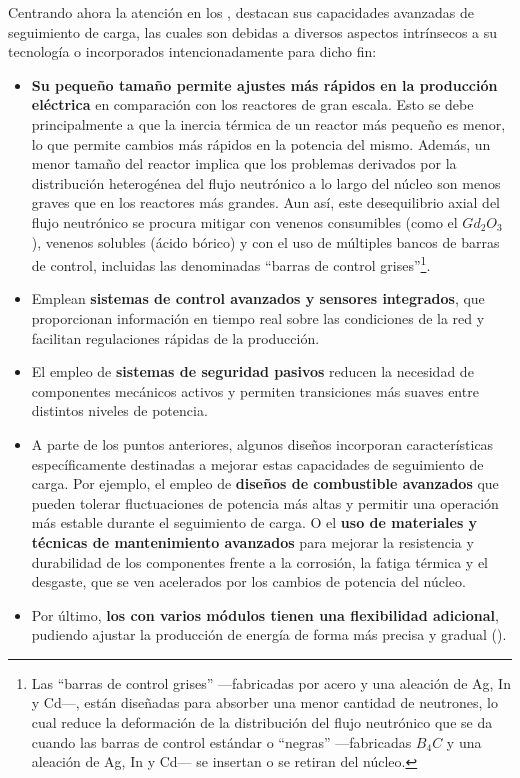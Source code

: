 Centrando ahora la atención en los , destacan sus capacidades avanzadas de seguimiento de carga, las cuales son debidas a diversos aspectos intrínsecos a su tecnología o incorporados intencionadamente para dicho fin:
\begin{itemize}
  \item \textbf{Su pequeño tamaño permite ajustes más rápidos en la producción eléctrica} en comparación con los reactores de gran escala. Esto se debe principalmente a que la inercia térmica de un reactor más pequeño es menor, lo que permite cambios más rápidos en la potencia del mismo. Además, un menor tamaño del reactor implica que los problemas derivados por la distribución heterogénea del flujo neutrónico a lo largo del núcleo son menos graves que en los reactores más grandes. Aun así, este desequilibrio axial del flujo neutrónico se procura mitigar con venenos consumibles (como el $Gd_2O_3$), venenos solubles (ácido bórico) y con el uso de múltiples bancos de barras de control, incluidas las denominadas ``barras de control grises''\footnote{Las ``barras de control grises'' ---fabricadas por acero y una aleación de Ag, In y Cd---, están diseñadas para absorber una menor cantidad de neutrones, lo cual reduce la deformación de la distribución del flujo neutrónico que se da cuando las barras de control estándar o ``negras'' ---fabricadas $B_4C$ y una aleación de Ag, In y Cd--- se insertan o se retiran del núcleo.}.
  \item Emplean \textbf{sistemas de control avanzados y sensores integrados}, que proporcionan información en tiempo real sobre las condiciones de la red y facilitan regulaciones rápidas de la producción.
  \item El empleo de \textbf{sistemas de seguridad pasivos} reducen la necesidad de componentes mecánicos activos y permiten transiciones más suaves entre distintos niveles de potencia.
  \item A parte de los puntos anteriores, algunos diseños incorporan características específicamente destinadas a mejorar estas capacidades de seguimiento de carga. Por ejemplo, el empleo de \textbf{diseños de combustible avanzados} que pueden tolerar fluctuaciones de potencia más altas y permitir una operación más estable durante el seguimiento de carga. O el \textbf{uso de materiales y técnicas de mantenimiento avanzados} para mejorar la resistencia y durabilidad de los componentes frente a la corrosión, la fatiga térmica y el desgaste, que se ven acelerados por los cambios de potencia del núcleo.
  \item Por último, \textbf{los  con varios módulos tienen una flexibilidad adicional}, pudiendo ajustar la producción de energía de forma más precisa y gradual (\cite{smr_load_following_capabilities}).
\end{itemize}


